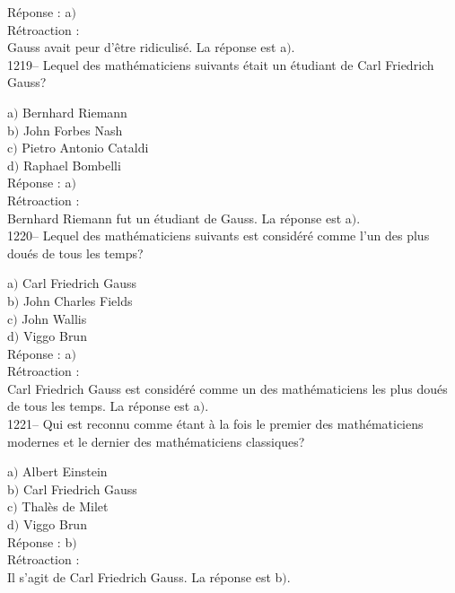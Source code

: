 ﻿\documentclass[letterpaper, 12pt]{article}
\begin{document}
R\'eponse : a$)$\\

R\'etroaction :\\
Gauss avait peur d'\^etre ridiculis\'e.
La r\'eponse est a$)$.\\

1219-- Lequel des math\'ematiciens suivants \'etait un \'etudiant de
Carl Friedrich Gauss?

a$)$ Bernhard Riemann \\
b$)$ John Forbes Nash \\
c$)$ Pietro Antonio Cataldi \\
d$)$ Raphael Bombelli\\

R\'eponse : a$)$\\

R\'etroaction : \\
Bernhard Riemann fut un \'etudiant de Gauss.
La r\'eponse est a$)$.\\

1220-- Lequel des math\'ematiciens suivants est consid\'er\'e comme
l'un des plus dou\'es de tous les temps?

a$)$ Carl Friedrich Gauss \\
b$)$ John Charles Fields \\
c$)$ John Wallis \\
d$)$ Viggo Brun\\

R\'eponse : a$)$\\

R\'etroaction : \\
Carl Friedrich Gauss est consid\'er\'e comme un des math\'ematiciens
les plus dou\'es de tous les temps.
La r\'eponse est a$)$.\\

1221-- Qui est reconnu comme \'etant \`a la fois le premier des
math\'ematiciens modernes et le dernier des math\'ematiciens
classiques?

a$)$ Albert Einstein \\
b$)$ Carl Friedrich Gauss \\
c$)$ Thal\`es de Milet \\
d$)$ Viggo Brun\\

R\'eponse : b$)$\\

R\'etroaction : \\
Il s'agit de Carl Friedrich Gauss.
La r\'eponse est b$)$.\\
\end{document}
